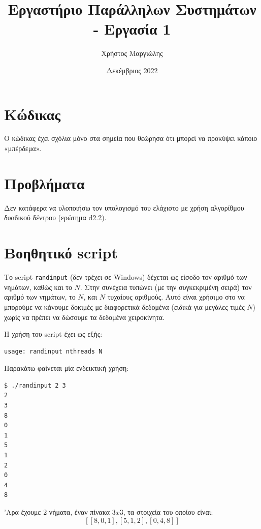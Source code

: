 \documentclass{article}
\title{Εργαστήριο Παράλληλων Συστημάτων - Εργασία 1}
\author{Χρήστος Μαργιώλης}
\date{Δεκέμβριος 2022}
\begin{document}
\begin{titlepage}
        \maketitle
\end{titlepage}

\renewcommand{\contentsname}{Περιεχόμενα}
\tableofcontents
\pagebreak

\section{Κώδικας}

Ο κώδικας έχει σχόλια μόνο στα σημεία που θεώρησα ότι μπορεί να προκύψει κάποιο
«μπέρδεμα».



\section{Προβλήματα}

Δεν κατάφερα να υλοποιήσω τον υπολογισμό του ελάχιστο με χρήση αλγορίθμου
δυαδικού δέντρου (ερώτημα d2.2).

\section{Βοηθητικό script}



Το script \lstinline{randinput} (δεν τρέχει σε Windows) δέχεται ως είσοδο τον
αριθμό των νημάτων, καθώς και το $N$. Στην συνέχεια τυπώνει (με την
συγκεκριμένη σειρά) τον αριθμό των νημάτων, το $N$, και $N$ τυχαίους αριθμούς.
Αυτό είναι χρήσιμο στο να μπορούμε να κάνουμε δοκιμές με διαφορετικά δεδομένα
(ειδικά για μεγάλες τιμές $N$) χωρίς να πρέπει να δώσουμε τα δεδομένα
χειροκίνητα.

Η χρήση του script έχει ως εξής:

\begin{lstlisting}
usage: randinput nthreads N
\end{lstlisting}

Παρακάτω φαίνεται μία ενδεικτική χρήση:

\begin{lstlisting}
$ ./randinput 2 3
2
3
8
0
1
5
1
2
0
4
8
\end{lstlisting}

'Αρα έχουμε 2 νήματα, έναν πίνακα $3x3$, τα στοιχεία του οποίου είναι:
\[[[8, 0, 1], [5, 1, 2], [0, 4, 8]]\]
\end{document}
